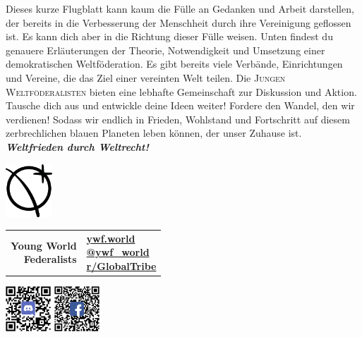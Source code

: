 \documentclass[11pt,a4paper]{article}
\begin{document}
Dieses kurze Flugblatt kann kaum die Fülle an Gedanken und Arbeit darstellen, der bereits in die Verbesserung der Menschheit durch ihre Vereinigung geflossen ist.
Es kann dich aber in die Richtung dieser Fülle weisen.
Unten findest du genauere Erläuterungen der Theorie, Notwendigkeit und Umsetzung einer demokratischen Weltföderation. Es gibt bereits viele Verbände, Einrichtungen und Vereine, die das Ziel einer vereinten Welt teilen.
Die \textsc{Jungen Weltföderalisten} bieten eine lebhafte Gemeinschaft zur Diskussion und Aktion.
Tausche dich aus und entwickle deine Ideen weiter!
Fordere den Wandel, den wir verdienen!
Sodass wir endlich in Frieden, Wohlstand und Fortschritt auf diesem zerbrechlichen blauen Planeten leben können, der unser Zuhause ist.  \hfill \textbf{\textit{Weltfrieden durch Weltrecht!}}
\vspace{11pt}
\hline

\begin{multicols}{2}
\nocite{*}
\begingroup
{}
\setlength\bibitemsep{2pt}
\printbibliography[heading=none]
\endgroup
\end{multicols}

\hline
\vspace{6px}
\begin{minipage}{0.2\textwidth}
   \centering
    \includegraphics[height=75px]{LOGO.eps}
\end{minipage}%
\begin{minipage}{0.45\textwidth}
\begin{shaded*}
\begin{tabularx}{0.5\textwidth}{r|X}
\makecell[r]{\LARGE{\textbf{Young World}}\\ \LARGE{\textbf{Federalists}}} & \makecell[l]{\textbf{\href{https://www.ywf.world}{ywf.world}} \\ \textbf{\href{https://twitter.com/ywf_world}{@ywf\_world}}\\  
\textbf{\href{https://www.reddit.com/r/GlobalTribe/}{r/GlobalTribe}}}
\end{tabularx}
\end{shaded*}
\end{minipage}%
\begin{minipage}{0.3\textwidth}
\centering
\includegraphics[height=64px]{qrcode-discord.eps} \includegraphics[height=64px]{qrcode-facebook.eps}

\end{minipage}%
\end{document}
